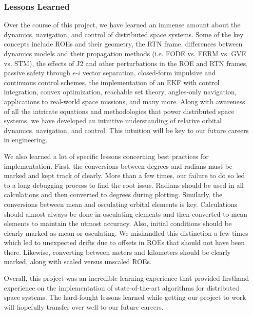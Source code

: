 \subsubsection{Lessons Learned}
Over the course of this project, we have learned an immense amount about the dynamics, navigation, and control of distributed space systems. Some of the key concepts include ROEs and their geometry, the RTN frame, differences between dynamics models and their propagation methods (i.e. FODE vs. FERM vs. GVE vs. STM), the effects of J2 and other perturbations in the ROE and RTN frames, passive safety through $e$-$i$ vector separation, closed-form impulsive and continuous control schemes, the implementation of an EKF with control integration, convex optimization, reachable set theory, angles-only navigation, applications to real-world space missions, and many more. Along with awareness of all the intricate equations and methodologies that power distributed space systems, we have developed an intuitive understanding of relative orbital dynamics, navigation, and control. This intuition will be key to our future careers in engineering.

We also learned a lot of specific lessons concerning best practices for implementation. First, the conversions between degrees and radians must be marked and kept track of clearly. More than a few times, our failure to do so led to a long debugging process to find the root issue. Radians should be used in all calculations and then converted to degrees during plotting. Similarly, the conversions between mean and osculating orbital elements is key. Calculations should almost always be done in osculating elements and then converted to mean elements to maintain the utmost accuracy. Also, initial conditions should be clearly marked as mean or osculating. We mishandled this distinction a few times which led to unexpected drifts due to offsets in ROEs that should not have been there. Likewise, converting between meters and kilometers should be clearly marked, along with scaled versus unscaled ROEs.

Overall, this project was an incredible learning experience that provided firsthand experience on the implementation of state-of-the-art algorithms for distributed space systems. The hard-fought lessons learned while getting our project to work will hopefully transfer over well to our future careers. 

